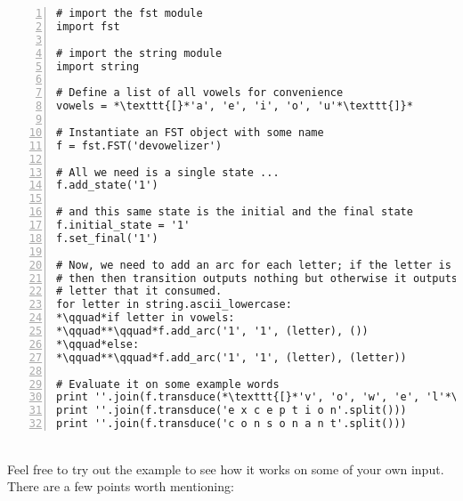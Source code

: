 \documentclass[11pt]{article}
\begin{document}
\begin{lstlisting}[float, label=example,caption=A 1-state transducer that deletes vowels, frame=trBL,escapechar=*, numbers=left, numberstyle=\tiny, numberblanklines=false]
# import the fst module
import fst

# import the string module
import string

# Define a list of all vowels for convenience
vowels = *\texttt{[}*'a', 'e', 'i', 'o', 'u'*\texttt{]}*

# Instantiate an FST object with some name
f = fst.FST('devowelizer')

# All we need is a single state ...
f.add_state('1')

# and this same state is the initial and the final state
f.initial_state = '1'
f.set_final('1')

# Now, we need to add an arc for each letter; if the letter is a vowel
# then then transition outputs nothing but otherwise it outputs the same
# letter that it consumed.
for letter in string.ascii_lowercase:
*\qquad*if letter in vowels:
*\qquad**\qquad*f.add_arc('1', '1', (letter), ())
*\qquad*else:
*\qquad**\qquad*f.add_arc('1', '1', (letter), (letter))

# Evaluate it on some example words
print ''.join(f.transduce(*\texttt{[}*'v', 'o', 'w', 'e', 'l'*\texttt{]}*))
print ''.join(f.transduce('e x c e p t i o n'.split()))
print ''.join(f.transduce('c o n s o n a n t'.split()))

\end{lstlisting}
\mbox{}\\
 Feel free to try out the example to see how it works on some of your
 own input. There are a few points worth mentioning:
\end{document}
